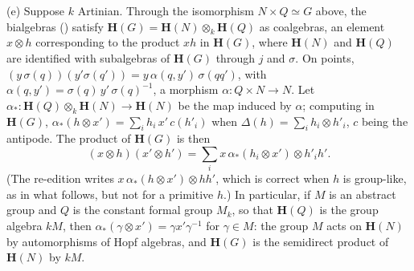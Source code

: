 
\smallskip\noindent
{}
\label{sga3:VIIB:2.4.B}%
\textup{(e)} Suppose \(k\) Artinian. Through the isomorphism
\(N\times Q\simeq G\) above, the bialgebras \textup{()} satisfy
\(\mathbf H(G)=\mathbf H(N)\otimes_k\mathbf H(Q)\) as coalgebras, an
element \(x\otimes h\) corresponding to the product \(xh\) in
\(\mathbf H(G)\), where \(\mathbf H(N)\) and \(\mathbf H(Q)\) are
identified with subalgebras of \(\mathbf H(G)\) through \(j\) and
\(\sigma\). On points,
\((y\,\sigma(q))(y'\sigma(q'))=y\,\alpha(q,y')\,\sigma(qq')\), with
\(\alpha(q,y')=\sigma(q)\,y'\,\sigma(q)^{-1}\), a morphism
\(\alpha:Q\times N\to N\). Let
\(\alpha_*:\mathbf H(Q)\otimes_k\mathbf H(N)\to\mathbf H(N)\) be the map
induced by \(\alpha\); computing in \(\mathbf H(G)\),
\(\alpha_*(h\otimes x')=\sum_ih_i\,x'\,c(h'_i)\) when
\(\Delta(h)=\sum_ih_i\otimes h'_i\), \(c\) being the antipode. The product
of \(\mathbf H(G)\) is then
\[
  (x\otimes h)(x'\otimes h')
  =
  \sum_ix\,\alpha_*(h_i\otimes x')\otimes h'_ih'.
\]
\textup{(The re-edition writes \(x\,\alpha_*(h\otimes x')\otimes hh'\), which
is correct when \(h\) is group-like, as in what follows, but not for a
primitive \(h\).)} In particular, if \(M\) is an abstract group and \(Q\) is
the constant formal group \(M_k\), so that \(\mathbf H(Q)\) is the group
algebra \(kM\), then \(\alpha_*(\gamma\otimes x')=\gamma x'\gamma^{-1}\) for
\(\gamma\in M\): the group \(M\) acts on \(\mathbf H(N)\) by automorphisms of
Hopf algebras, and \(\mathbf H(G)\) is the semidirect product of
\(\mathbf H(N)\) by \(kM\).

